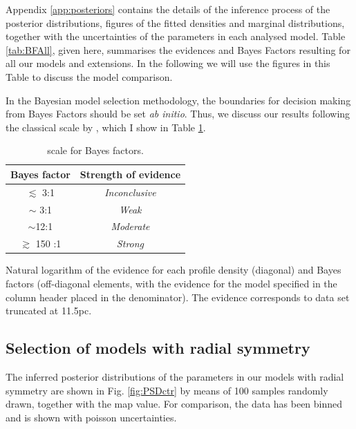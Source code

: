 Appendix \ref{app:posteriors} contains the details of the inference process 
of the posterior distributions, figures of the fitted densities and marginal distributions, 
together with the uncertainties of the parameters in each analysed model.
Table \ref{tab:BFAll}, given here, summarises the evidences and Bayes Factors
resulting for all our models and extensions. In the following we will use the figures in this Table to discuss the model comparison.


In the Bayesian model selection methodology, the boundaries for decision making from Bayes Factors should be set \emph{ab initio}. Thus, we discuss our results following the classical scale by \cite{Jeffreys61}, which I show in Table \ref{tab:JeffreysScale}.

\begin{table}[H]
\caption{\citet{Jeffreys61} scale for Bayes factors.}
\begin{center}
\begin{tabular}{cc}
Bayes factor & Strength of evidence\\
\hline
$\lesssim$ 3:1 & \emph{Inconclusive}\\
$\sim$ 3:1 & \emph{Weak}\\
$\sim$12:1 & \emph{Moderate}\\
$\gtrsim$ 150 :1 & \emph{Strong}\\
\hline
\end{tabular}
\end{center}
\label{tab:JeffreysScale}
\end{table}%
 

\begin{table}
\tabcolsep=1pt
  \centering
  \caption[]{Natural logarithm of the evidence for each
        profile density (diagonal) and Bayes factors (off-diagonal
        elements, with the evidence for the model specified in the
        column header placed in the denominator). The evidence
        corresponds to data set truncated at 11.5pc.}  \label{tab:BFAll}
 \resizebox{\textwidth}{!}{
    
    }
  \end{table}

\subsection{Selection of models with radial symmetry} 

The inferred posterior distributions of the parameters in our models with radial symmetry are shown in Fig. \ref{fig:PSDctr} by means of 100 samples randomly drawn, together with the \gls{map} value. For comparison, the data has been binned and is shown with poisson uncertainties.

